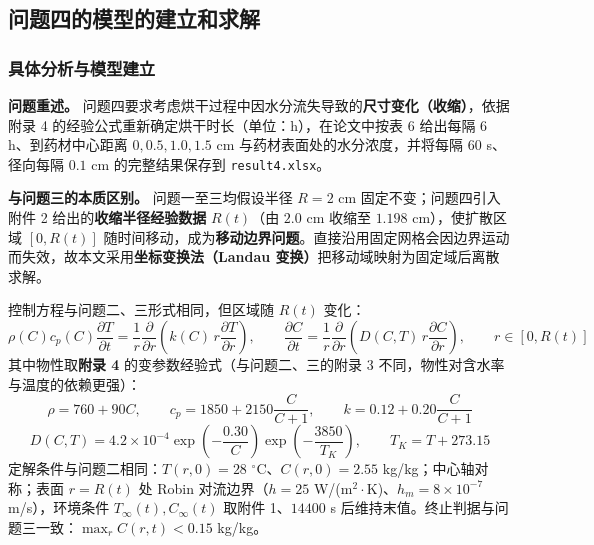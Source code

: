 \subsection{问题四的模型的建立和求解}

\subsubsection{具体分析与模型建立}

\textbf{问题重述。} 问题四要求考虑烘干过程中因水分流失导致的\textbf{尺寸变化（收缩）}，依据附录 4 的经验公式重新确定烘干时长（单位：h），在论文中按表 6 给出每隔 $6$ h、到药材中心距离 $0,0.5,1.0,1.5$ cm 与药材表面处的水分浓度，并将每隔 $60$ s、径向每隔 $0.1$ cm 的完整结果保存到 \texttt{result4.xlsx}。

\textbf{与问题三的本质区别。} 问题一至三均假设半径 $R=2$ cm 固定不变；问题四引入附件 2 给出的\textbf{收缩半径经验数据} $R(t)$（由 $2.0$ cm 收缩至 $1.198$ cm），使扩散区域 $[0,R(t)]$ 随时间移动，成为\textbf{移动边界问题}。直接沿用固定网格会因边界运动而失效，故本文采用\textbf{坐标变换法（Landau 变换）}把移动域映射为固定域后离散求解。

控制方程与问题二、三形式相同，但区域随 $R(t)$ 变化：
\begin{equation}
  \rho(C)c_p(C)\frac{\partial T}{\partial t}=\frac{1}{r}\frac{\partial}{\partial r}\left(k(C)\,r\frac{\partial T}{\partial r}\right),\qquad
  \frac{\partial C}{\partial t}=\frac{1}{r}\frac{\partial}{\partial r}\left(D(C,T)\,r\frac{\partial C}{\partial r}\right),\qquad r\in[0,R(t)]
  \label{eq:p4_pde}
\end{equation}
其中物性取\textbf{附录 4} 的变参数经验式（与问题二、三的附录 3 不同，物性对含水率与温度的依赖更强）：
\begin{equation}
  \rho=760+90C,\qquad
  c_p=1850+2150\frac{C}{C+1},\qquad
  k=0.12+0.20\frac{C}{C+1}
  \label{eq:p4_param}
\end{equation}
\begin{equation}
  D(C,T)=4.2\times10^{-4}\exp\!\left(-\frac{0.30}{C}\right)\exp\!\left(-\frac{3850}{T_K}\right),\qquad T_K=T+273.15
  \label{eq:p4_D}
\end{equation}
定解条件与问题二相同：$T(r,0)=28$ $^\circ$C、$C(r,0)=2.55$ kg/kg；中心轴对称；表面 $r=R(t)$ 处 Robin 对流边界（$h=25$ W/(m$^2\cdot$K)、$h_m=8\times10^{-7}$ m/s），环境条件 $T_\infty(t),C_\infty(t)$ 取附件 1、$14400$ s 后维持末值。终止判据与问题三一致：$\max_r C(r,t)<0.15$ kg/kg。

